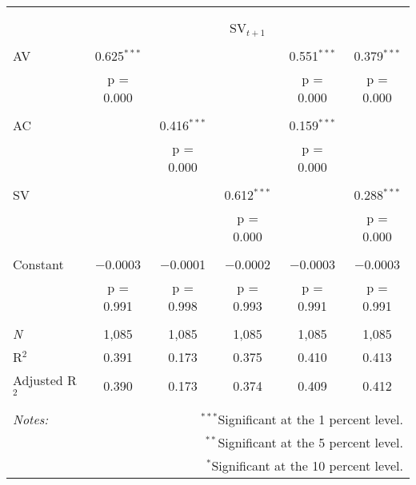
\begin{tabular}{@{\extracolsep{5pt}}lccccc} 
\\[-1.8ex]\hline 
\hline \\[-1.8ex] 
\\[-1.8ex] & \multicolumn{5}{c}{SV$_{t+1}$} \\ 
\hline \\[-1.8ex] 
 AV & 0.625$^{***}$ &  &  & 0.551$^{***}$ & 0.379$^{***}$ \\ 
  & p = 0.000 &  &  & p = 0.000 & p = 0.000 \\ 
  & & & & & \\ 
 AC &  & 0.416$^{***}$ &  & 0.159$^{***}$ &  \\ 
  &  & p = 0.000 &  & p = 0.000 &  \\ 
  & & & & & \\ 
 SV &  &  & 0.612$^{***}$ &  & 0.288$^{***}$ \\ 
  &  &  & p = 0.000 &  & p = 0.000 \\ 
  & & & & & \\ 
 Constant & $-$0.0003 & $-$0.0001 & $-$0.0002 & $-$0.0003 & $-$0.0003 \\ 
  & p = 0.991 & p = 0.998 & p = 0.993 & p = 0.991 & p = 0.991 \\ 
  & & & & & \\ 
\textit{N} & 1,085 & 1,085 & 1,085 & 1,085 & 1,085 \\ 
R$^{2}$ & 0.391 & 0.173 & 0.375 & 0.410 & 0.413 \\ 
Adjusted R$^{2}$ & 0.390 & 0.173 & 0.374 & 0.409 & 0.412 \\ 
\hline 
\hline \\[-1.8ex] 
\textit{Notes:} & \multicolumn{5}{r}{$^{***}$Significant at the 1 percent level.} \\ 
 & \multicolumn{5}{r}{$^{**}$Significant at the 5 percent level.} \\ 
 & \multicolumn{5}{r}{$^{*}$Significant at the 10 percent level.} \\ 
\end{tabular} 
